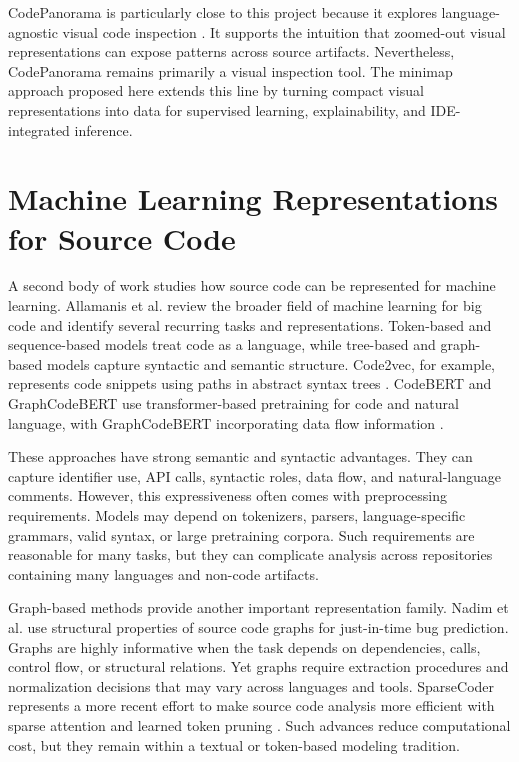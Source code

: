 CodePanorama is particularly close to this project because it explores
language-agnostic visual code inspection \cite{etter2022codepanorama}. It
supports the intuition that zoomed-out visual representations can expose
patterns across source artifacts. Nevertheless, CodePanorama remains primarily a
visual inspection tool. The minimap approach proposed here extends this line by
turning compact visual representations into data for supervised learning,
explainability, and IDE-integrated inference.

\section{Machine Learning Representations for Source Code}

A second body of work studies how source code can be represented for machine
learning. Allamanis et al. \cite{allamanis2018survey} review the broader field
of machine learning for big code and identify several recurring tasks and
representations. Token-based and sequence-based models treat code as a language,
while tree-based and graph-based models capture syntactic and semantic structure.
Code2vec, for example, represents code snippets using paths in abstract syntax
trees \cite{alon2019code2vec}. CodeBERT and GraphCodeBERT use transformer-based
pretraining for code and natural language, with GraphCodeBERT incorporating data
flow information \cite{feng2020codebert,guo2021graphcodebert}.

These approaches have strong semantic and syntactic advantages. They can capture
identifier use, API calls, syntactic roles, data flow, and natural-language
comments. However, this expressiveness often comes with preprocessing
requirements. Models may depend on tokenizers, parsers, language-specific
grammars, valid syntax, or large pretraining corpora. Such requirements are
reasonable for many tasks, but they can complicate analysis across repositories
containing many languages and non-code artifacts.

Graph-based methods provide another important representation family. Nadim et
al. \cite{nadim2022sourcecodegraphs} use structural properties of source code
graphs for just-in-time bug prediction. Graphs are highly informative when the
task depends on dependencies, calls, control flow, or structural relations. Yet
graphs require extraction procedures and normalization decisions that may vary
across languages and tools. SparseCoder represents a more recent effort to make
source code analysis more efficient with sparse attention and learned token
pruning \cite{yang2025sparsecoder}. Such advances reduce computational cost, but
they remain within a textual or token-based modeling tradition.

